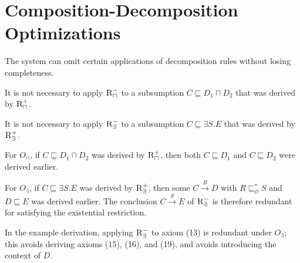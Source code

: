 \documentclass[11pt]{article}
\newcommand{\Ont}{\mathcal O}
\newcommand{\sub}{\sqsubseteq}
\begin{document}
\section{Composition-Decomposition Optimizations}

The system can omit certain applications of decomposition rules without losing completeness.

\begin{description}[leftmargin=2.5em]
\item[$O_{\sqcap}$] It is not necessary to apply $\textsc{R}_{\sqcap}^{-}$ to a subsumption $C \sub D_1 \sqcap D_2$ that was derived by $\textsc{R}_{\sqcap}^{+}$.
\item[$O_{\exists}$] It is not necessary to apply $\textsc{R}_{\exists}^{-}$ to a subsumption $C \sub \exists S.E$ that was derived by $\textsc{R}_{\exists}^{+}$.
\end{description}

For $O_{\sqcap}$, if $C \sub D_1 \sqcap D_2$ was derived by $\textsc{R}_{\sqcap}^{+}$, then both $C \sub D_1$ and $C \sub D_2$ were derived earlier.

For $O_{\exists}$, if $C \sub \exists S.E$ was derived by $\textsc{R}_{\exists}^{+}$, then some $C \xrightarrow{R} D$ with $R \sub^{*}_{\Ont} S$ and $D \sub E$ was derived earlier. The conclusion $C \xrightarrow{S} E$ of $\textsc{R}_{\exists}^{-}$ is therefore redundant for satisfying the existential restriction.

In the example derivation, applying $\textsc{R}_{\exists}^{-}$ to axiom (13) is redundant under $O_{\exists}$; this avoids deriving axioms (15), (16), and (19), and avoids introducing the context of $D$.
\end{document}
